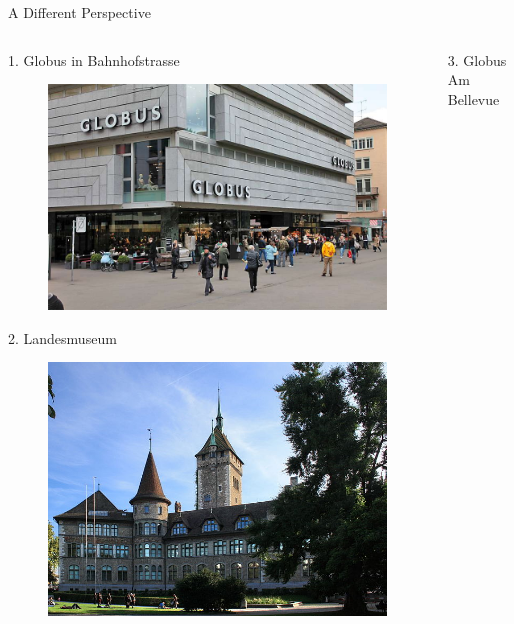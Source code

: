 \documentclass{beamer}
\begin{document}
\begin{frame}{A Different Perspective}
  \begin{columns}
    \begin{column}{0.48\textwidth}
       1. Globus in Bahnhofstrasse
       \begin{figure}
         \centering
         \includegraphics[height=.2\textheight]{globus_bahnhof}
       \end{figure}
       2. Landesmuseum
       \begin{figure}
         \centering
         \includegraphics[height=.2\textheight]{landesmuseum}
       \end{figure}
    \end{column}
    \begin{column}{0.48\textwidth}
      3. Globus Am Bellevue

\end{column}
\end{columns}
\end{frame}
\end{document}
